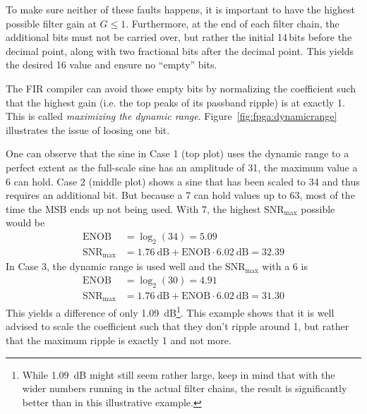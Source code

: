 To make  sure neither  of these faults  happens, it is  important to  have the
highest possible  filter gain at $G  \leq 1$. Furthermore, at the  end of each
filter chain,  the additional bits  must not be  carried over, but  rather the
initial \num{14}\,bits  before the  decimal point,  along with  two fractional
bits after the decimal point. This  yields the desired \SI{16}{\bit} value and
ensure no ``empty'' bits.

The FIR  compiler can avoid  those empty  bits by normalizing  the coefficient
such  that the  highest  gain (i.e.  the  top peaks  of  its passband  ripple)
is  at  exactly   \num{1}.   This  is  called   \emph{maximizing  the  dynamic
range}. Figure~\ref{fig:fpga:dynamicrange}  illustrates the  issue of  loosing
one bit.

One can  observe that  the sine in  Case \num{1} (top  plot) uses  the dynamic
range to a perfect extent as the full-scale sine has an amplitude of \num{31},
the maximum  value a \SI{6}{\bit}   can hold. Case  \num{2} (middle
plot) shows  a sine  that has  been scaled  to \num{34}  and thus  requires an
additional bit.  But  because a \SI{7}{\bit}  can hold  values up to
\num{63}, most of the time the MSB  ends up not being used. With \SI{7}{\bit},
the highest $\mathrm{SNR}_\mathrm{max}$ possible would be
\begin{align}
    \mathrm{ENOB}             &= \log_2(34) = 5.09 \nonumber \\
    \mathrm{SNR}_\mathrm{max} &= \SI{1.76}{\dB} + \mathrm{ENOB} \cdot \SI{6.02}{\dB} = 32.39
\end{align}
In   Case    \num{3},   the   dynamic    range   is   used   well    and   the
$\mathrm{SNR}_\mathrm{max}$ with a \SI{6}{\bit}  is
\begin{align}
    \mathrm{ENOB}             &= \log_2(30)  = 4.91 \nonumber\\
    \mathrm{SNR}_\mathrm{max} &= \SI{1.76}{\dB} + \mathrm{ENOB} \cdot \SI{6.02}{\dB} = 31.30
\end{align}
This yields a difference of only \SI{1.09}{\dB}\footnote{%
    While \SI{1.09}{\dB} might still seem rather large, keep in mind that with
    the  wider numbers  running in  the actual  filter chains,  the result  is
    significantly better than in this illustrative example.%
}.
This example shows that it is well  advised to scale the coefficient such that
they  don't ripple  around  \num{1}, but  rather that  the  maximum ripple  is
exactly \num{1} and not more.

